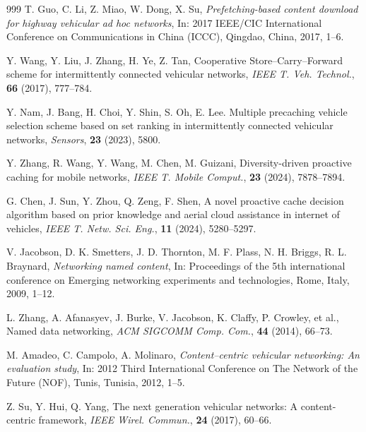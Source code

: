 \documentclass{aims}
\numberwithin{equation}{section}
\begin{document}
\begin{thebibliography}{999}
 T. Guo, C. Li, Z. Miao, W. Dong, X. Su, \emph{Prefetching-based content download for highway vehicular ad hoc networks},  In: 2017 IEEE/CIC International Conference on Communications in China (ICCC), Qingdao, China, 2017, 1--6. 

 Y. Wang, Y. Liu, J. Zhang, H. Ye, Z. Tan,  Cooperative Store–Carry–Forward scheme for intermittently connected vehicular networks,  \emph{IEEE T. Veh. Technol.}, \textbf{66} (2017),  777--784. 

 Y. Nam, J. Bang, H. Choi, Y. Shin, S. Oh, E. Lee.  Multiple precaching vehicle selection scheme based on set ranking in intermittently connected vehicular networks,  \emph{Sensors}, \textbf{23} (2023), 5800. 

 Y. Zhang, R. Wang, Y. Wang, M. Chen, M. Guizani,  Diversity-driven proactive caching for mobile networks,  \emph{IEEE T. Mobile Comput.}, \textbf{23} (2024), 7878--7894. 

 G. Chen, J. Sun, Y. Zhou, Q. Zeng, F. Shen,  A novel proactive cache decision algorithm based on prior knowledge and aerial cloud assistance in internet of vehicles,  \emph{IEEE T. Netw. Sci. Eng.}, \textbf{11} (2024), 5280--5297. 

 V. Jacobson, D. K. Smetters, J. D. Thornton, M. F. Plass, N. H. Briggs, R. L. Braynard, \emph{Networking named content},  In: Proceedings of the 5th international conference on Emerging networking experiments and technologies, Rome, Italy, 2009, 1--12. 

 L. Zhang, A. Afanasyev, J. Burke, V. Jacobson, K. Claffy, P. Crowley, et al.,  Named data networking,  \emph{ACM SIGCOMM Comp. Com.}, \textbf{44} (2014), 66--73. 

 M. Amadeo, C. Campolo, A. Molinaro,  \emph{Content--centric vehicular networking: An evaluation study},  In: 2012 Third International Conference on The Network of the Future (NOF), Tunis, Tunisia, 2012,  1--5. 

 Z. Su, Y. Hui, Q. Yang,  The next generation vehicular networks: A content-centric framework,  \emph{IEEE Wirel. Commun.},  \textbf{24} (2017), 60--66. 


\end{thebibliography}
\end{document}
